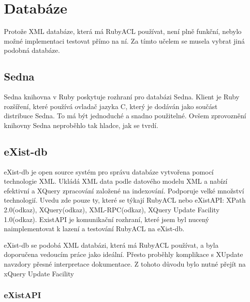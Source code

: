 {\section{Databáze}
Protože XML databáze, která má RubyACL používat, není plně funkční, nebylo možné implementaci testovat přímo na ní. Za tímto učelem se musela vybrat jiná podobná databáze.

\subsection{Sedna}
Sedna knihovna v Ruby poskytuje rozhraní pro databázi Sedna. Klient je Ruby rozšíření, které používá ovladač jazyka C, který je dodáván jako součást distribuce Sedna. To má být jednoduché a snadno použitelné. Ovšem zprovoznění knihovny Sedna neproběhlo tak hladce, jak se tvrdí.

\subsection{eXist-db}
eXist-db je open source systém pro správu databáze vytvořena pomocí technologie XML. Ukládá XML data podle datového modelu XML a nabízí efektivní a XQuery zpracování založené na indexování. Podporuje velké množství technologií. Uvedu zde pouze ty, které se týkají RubyACL nebo eXistAPI: XPath 2.0(odkaz), XQuery(odkaz), XML-RPC(odkaz), XQuery Update Facility 1.0(odkaz). ExistAPI je komunikační rozhraní, které jsem byl nucený naimplementovat k lazení a testování RubyACL na eXist-db.

eXist-db se podobá XML databázi, která má RubyACL používat, a byla doporučena vedoucím práce jako ideální. Přesto proběhly komplikace s XUpdate navzdory přesné interpretace dokumentace. Z tohoto důvodu bylo nutné přejít na xQuery Update Facility


\subsubsection{eXistAPI}

}
